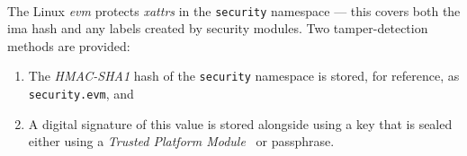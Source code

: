 \paragraph{} The Linux \textit{\acrfull{evm}} protects \textit{\acrshort{xattr}s} in the \texttt{security} namespace --- this covers both the \acrshort{ima} hash and any labels created by security modules. Two tamper-detection methods are provided:

\begin{enumerate}
    \item The \textit{HMAC-SHA1} hash of the \texttt{security} namespace is stored, for reference, as \texttt{security.evm}, and
    \item A digital signature of this value is stored alongside using a key that is sealed either using a \textit{Trusted Platform Module}~\cite{tpm} or passphrase.
\end{enumerate}
